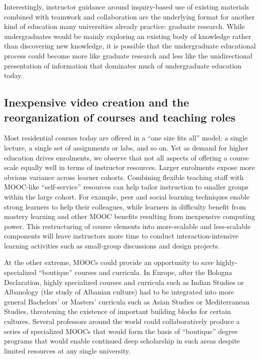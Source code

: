 Interestingly, instructor guidance around
inquiry-based use of existing materials combined with teamwork and
collaboration are the underlying format for another kind of education many
universities already practice:
graduate research.  While undergraduates would be mainly exploring an existing
body of knowledge rather than discovering new knowledge, it is possible
that the undergraduate educational process could become more like
graduate research and less like the unidirectional presentation of information
that dominates much of undergraduate education today.


\subsection{Inexpensive video creation and the reorganization of courses
  and teaching roles}

Most residential courses today are offered in a ``one size fits all''
model: a single lecture, a single set of assignments or labs, and so on.
Yet as demand for higher education drives enrolments, we observe that
not all aspects of offering a course scale equally well in terms of
instructor resources.
Larger enrolments expose more obvious variance across learner cohorts.
Combining flexible teaching staff with MOOC-like ``self-service''
resources can help tailor instruction to smaller groups within the large
cohort.   For example, peer and social learning techniques enable
strong learners to help their colleagues, while learners in difficulty
benefit from mastery learning and other MOOC benefits resulting from
inexpensive computing power.
This restructuring of course elements into more-scalable and less-scalable
components
will leave instructors more time to conduct
interaction-intensive learning activities such as small-group 
discussions and design projects.

At the other extreme, MOOCs could provide an opportunity to save
highly-specialized ``boutique'' courses and curricula.
In Europe, after the Bologna Declaration, highly specialized courses and
curricula such as Indian Studies or Albanology (the study of Albanian culture)
had to be integrated into more general Bachelors' or Masters' curricula
such as Asian Studies or Mediterranean Studies, threatening the
existence of important building blocks for certain cultures.
Several professors around the world could collaboratively produce a
series of specialized MOOCs that would form the basis of ``boutique''
degree programs that would enable continued deep scholarship in such
areas despite limited resources at any single university.

